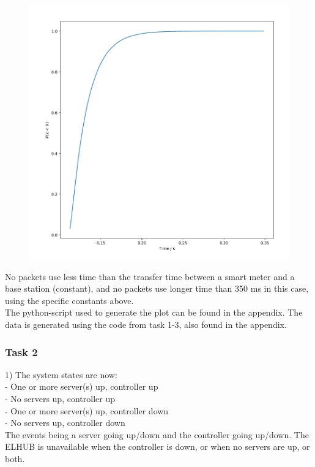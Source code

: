 \documentclass[11pt]{article}
\begin{document}
\begin{figure}[H]
	\includegraphics[width=\textwidth]{cdf_plot.png}
	\centering
\end{figure}

No packets use less time than the transfer time between a smart meter and a base station (constant), and no packets use longer time than 350 ms in this case, using the specific constants above.\\


The python-script used to generate the plot can be found in the appendix. The data is generated using the code from task 1-3, also found in the appendix.


\subsubsection{Task 2}

1) The system states are now:\\
- One or more server(s) up, controller up\\
- No servers up, controller up\\
- One or more server(s) up, controller down\\
- No servers up, controller down\\

The events being a server going up/down and the controller going up/down.
The ELHUB is unavailable when the controller is down, or when no servers are up, or both.\\
\end{document}
